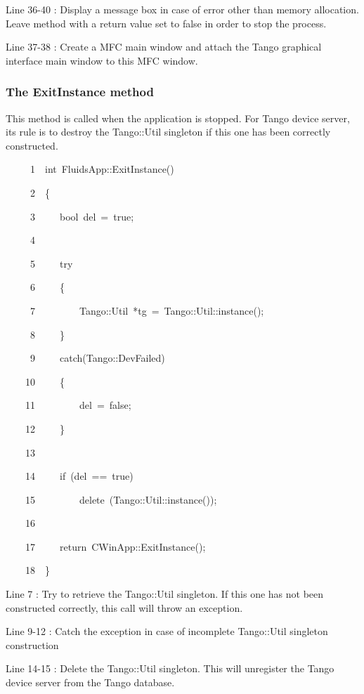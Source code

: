 Line 36-40 : Display a message box in case of error other than memory
allocation. Leave method with a return value set to false in order
to stop the process.

Line 37-38 : Create a MFC main window and attach the Tango
graphical interface main window to this MFC window.

\subsubsection{The ExitInstance method}

This method is called when the application is stopped. For Tango device
server, its rule is to destroy the Tango::Util singleton if this one
has been correctly constructed.


\begin{lyxcode}
~~~~~1~~int~FluidsApp::ExitInstance()

~~~~~2~~\{

~~~~~3~~~~~bool~del~=~true;

~~~~~4~~

~~~~~5~~~~~try

~~~~~6~~~~~\{

~~~~~7~~~~~~~~~Tango::Util~{*}tg~=~Tango::Util::instance();

~~~~~8~~~~~\}

~~~~~9~~~~~catch(Tango::DevFailed)

~~~~10~~~~~\{

~~~~11~~~~~~~~~del~=~false;

~~~~12~~~~~\}

~~~~13~~

~~~~14~~~~~if~(del~==~true)

~~~~15~~~~~~~~~delete~(Tango::Util::instance());

~~~~16~~

~~~~17~~~~~return~CWinApp::ExitInstance();

~~~~18~~\}
\end{lyxcode}


Line 7 : Try to retrieve the Tango::Util singleton. If this one has
not been constructed correctly, this call will throw an exception.

Line 9-12 : Catch the exception in case of incomplete Tango::Util
singleton construction

Line 14-15 : Delete the Tango::Util singleton. This will unregister
the Tango device server from the Tango database.

